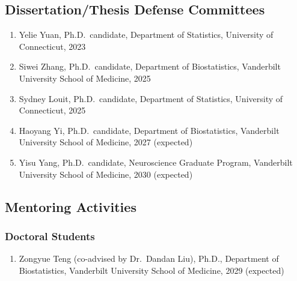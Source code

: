 \documentclass[12pt,letterpaper]{article}
\newenvironment{cventry}{\begin{minipage}[t]{\linewidth}}{\end{minipage}}
\begin{document}
	\subsection*{Dissertation/Thesis Defense Committees}
	\begin{enumerate}
		\item\begin{cventry} Yelie Yuan, Ph.D.\ candidate, Department 
		of Statistics, University of Connecticut, 2023
		\par\end{cventry}
		\item\begin{cventry} Siwei Zhang, Ph.D.\ candidate, 
		Department of Biostatistics, Vanderbilt University School of 
		Medicine, 2025
		\par\end{cventry}
		\item\begin{cventry} Sydney Louit, Ph.D.\ candidate, 
		Department of Statistics, University of Connecticut, 2025
		\par\end{cventry}
		\item\begin{cventry} Haoyang Yi, Ph.D.\ candidate,  
		Department of Biostatistics, Vanderbilt University School of 
		Medicine, 2027 (expected)
		\par\end{cventry}
		\item\begin{cventry} Yisu Yang, Ph.D.\ candidate, 
		Neuroscience Graduate Program, Vanderbilt University School 
		of Medicine, 2030 (expected)
		\par\end{cventry}
	\end{enumerate}
	
	\subsection*{Mentoring Activities}
	\subsubsection*{Doctoral Students}
	\begin{enumerate}
		\item\begin{cventry} Zongyue Teng (co-advised by Dr.\ Dandan Liu), Ph.D., 
		Department of Biostatistics, Vanderbilt University School of 
		Medicine, 2029 (expected)
		\par\end{cventry}
	\end{enumerate}
\end{document}
